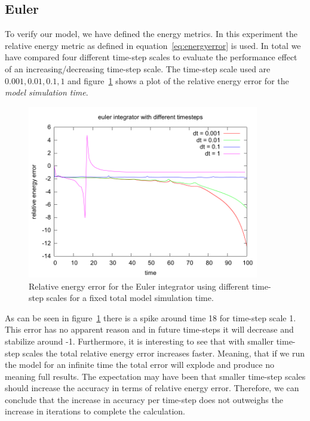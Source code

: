\documentclass[11pt]{article} %
\begin{document}
\subsection{Euler}
\label{sec:res:euler}
To verify our model, we have defined the energy metrics. In this experiment the relative energy metric as defined in equation~\ref{eq:energyerror} is used. In total we have compared four different time-step scales to evaluate the performance effect of an increasing/decreasing time-step scale. The time-step scale used are $0.001, 0.01, 0.1, 1$ and figure~\ref{fig:euler} shows a plot of the relative energy error for the \textit{model simulation time}. 
\begin{figure}
    \includegraphics[width=0.9\textwidth]{euler_different_timesteps.png}
    \caption{Relative energy error for the Euler integrator using different time-step scales for a fixed total model simulation time.}
    \label{fig:euler}
\end{figure}
As can be seen in figure~\ref{fig:euler} there is a spike around time 18 for time-step scale 1. This error has no apparent reason and in future time-steps it will decrease and stabilize around -1. Furthermore, it is interesting to see that with smaller time-step scales the total relative energy error increases faster. Meaning, that if we run the model for an infinite time the total error will explode and produce no meaning full results. The expectation may have been that smaller time-step scales should increase the accuracy in terms of relative energy error. Therefore, we can conclude that the increase in accuracy per time-step does not outweighs the increase in iterations to complete the calculation. 
\end{document}
